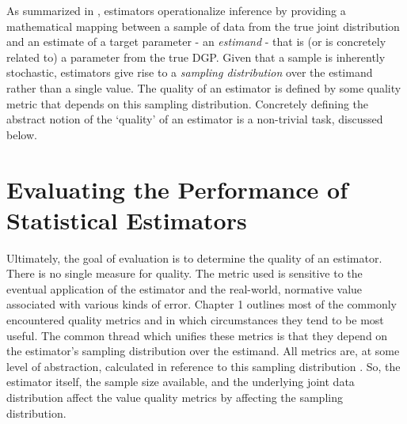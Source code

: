 \documentclass[../main.tex]{subfiles}
\begin{document}
\vspace{\baselineskip}
As summarized in \textcite{Calder1953StatisticalInference}, estimators operationalize inference by providing a mathematical mapping between a sample of data from the true joint distribution and an estimate of a target parameter - an \textit{estimand} - that is (or is concretely related to) a parameter from the true DGP. Given that a sample is inherently stochastic, estimators give rise to a \textit{sampling distribution }over the estimand rather than a single value. The quality of an estimator is defined by some quality metric that depends on this sampling distribution. Concretely defining the abstract notion of the ‘quality’ of an estimator is a non-trivial task, discussed below.\par

\section{Evaluating the Performance of Statistical Estimators}

\vspace{\baselineskip}
Ultimately, the goal of evaluation is to determine the quality of an estimator. There is no single measure for quality. The metric used is sensitive to the eventual application of the estimator and the real-world, normative value associated with various kinds of error. \textcite{Bishop2006PatternLearning} Chapter 1 outlines most of the commonly encountered quality metrics and in which circumstances they tend to be most useful. The common thread which unifies these metrics is that they depend on the estimator's sampling distribution over the estimand. All metrics are, at some level of abstraction, calculated in reference to this sampling distribution \parencite{Calder1953StatisticalInference}. So, the estimator itself, the sample size available, and the underlying joint data distribution affect the value quality metrics by affecting the sampling distribution.\par
\end{document}
